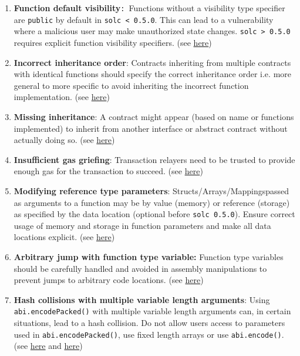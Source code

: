 \begin{enumerate}
\item\textbf{Function default visibility}\verb|: |Functions without a visibility type specifier are \verb|public| by default in \verb|solc < 0.5.0|. This can lead to a vulnerability where a malicious user may make unauthorized state changes. \verb|solc > 0.5.0| requires explicit function visibility specifiers. (see \href{https://swcregistry.io/docs/SWC-100}{here})

\item\textbf{Incorrect inheritance order}: Contracts inheriting from multiple contracts with identical functions should specify the correct inheritance order i.e. more general to more specific to avoid inheriting the incorrect function implementation. (see \href{https://swcregistry.io/docs/SWC-125}{here})

\item\textbf{Missing inheritance}: A contract might appear (based on name or functions implemented) to inherit from another interface or abstract contract without actually doing so. (see \href{https://github.com/crytic/slither/wiki/Detector-Documentation\#missing-inheritance}{here})

\item\textbf{Insufficient gas griefing}: Transaction relayers need to be trusted to provide enough gas for the transaction to succeed. (see \href{https://swcregistry.io/docs/SWC-126}{here})

\item\textbf{Modifying reference type parameters}: Structs/Arrays/Mappings\linebreak passed as arguments to a function may be by value (memory) or reference (storage) as specified by the data location (optional before \verb|solc 0.5.0|). Ensure correct usage of memory and storage in function parameters and make all data locations explicit. (see \href{https://github.com/crytic/slither/wiki/Detector-Documentation\#modifying-storage-array-by-value}{here})

\item\textbf{Arbitrary jump with function type variable: }Function type variables should be carefully handled and avoided in assembly manipulations to prevent jumps to arbitrary code locations. (see \href{https://swcregistry.io/docs/SWC-127}{here})

\item\textbf{Hash collisions with multiple variable length arguments}: Using \verb|abi.encodePacked()| with multiple variable length arguments can, in certain situations, lead to a hash collision. Do not allow users access to parameters used in \verb|abi.encodePacked()|, use fixed length arrays or use \verb|abi.encode()|. (see \href{https://swcregistry.io/docs/SWC-133}{here} and \href{https://docs.soliditylang.org/en/v0.5.3/abi-spec.html\#non-standard-packed-mode}{here})


\end{enumerate}
